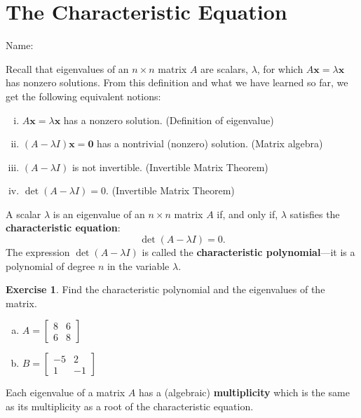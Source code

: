 \documentclass[10pt]{book}
\newcommand{\boxcolor}{gray!30}
\newenvironment{boxme}{\begin{mdframed}[backgroundcolor=\boxcolor,linewidth=0pt,nobreak=true]}{\end{mdframed}}
\newenvironment{boxdef}{\begin{mdframed}[backgroundcolor=\boxcolor,linewidth=0pt,nobreak=true]}{\end{mdframed}}
\theoremstyle{definition}
\newtheorem{exercise}{Exercise}[section]
\newcommand{\name}[1][2.5in]{\vspace{-2.3em}\hfill Name: \underline{\hspace{#1}}}
\newcommand{\vect}[1]{\ensuremath{\boldsymbol{\mathbf{#1}}}}
\newcommand{\Axlx}{A\vect{x}=\lambda\vect{x}}
\begin{document}
\newpage


\section{The Characteristic Equation}
\name

\begin{boxme}
	Recall that eigenvalues of an $n\times n$ matrix $A$ are scalars, $\lambda$, for which $\Axlx$ has nonzero solutions. From this definition and what we have learned so far, we get the following equivalent notions:
	\begin{enumerate}[(i)]\itemsep0em
		\item $\Axlx$ has a nonzero solution.
		\hfill (Definition of eigenvalue)
		\item $(A-\lambda I)\vect{x} = \vect{0}$ has a nontrivial (nonzero) solution.
		\hfill (Matrix algebra)
		\item $(A - \lambda I)$ is not invertible.
		\hfill (Invertible Matrix Theorem)
		\item $\det(A-\lambda I) = 0$.
		\hfill (Invertible Matrix Theorem)
	\end{enumerate}
	A scalar $\lambda$ is an eigenvalue of an $n\times n$ matrix $A$ if, and only if, $\lambda$ satisfies the \textbf{characteristic equation}:
	\vspace{-1em}
	$$ \det(A-\lambda I) = 0. $$
	The expression $\det(A-\lambda I)$ is called the \textbf{characteristic polynomial}---it is a polynomial of degree $n$ in the variable $\lambda$.
\end{boxme}

\begin{exercise} %
	Find the characteristic polynomial and the eigenvalues of the matrix.
	\begin{multicols}{2}
		\begin{enumerate}[(a)]
			\item $ A= \begin{bmatrix}8&6\\6&8\end{bmatrix} $
			\item $ B= \begin{bmatrix}-5&2\\1&-1\end{bmatrix} $
		\end{enumerate}
	\end{multicols}
\end{exercise}
\vfill


\begin{boxdef}
	Each eigenvalue of a matrix $A$ has a (algebraic) \textbf{multiplicity} which is the same as its multiplicity as a root of the characteristic equation.
\end{boxdef}
\end{document}
